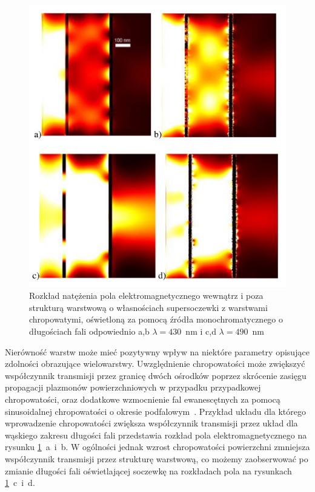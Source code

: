 \begin{figure}[!hbt]
	\begin{center}
	\includegraphics[width=.9\textwidth]{images/multilayer/plp-chropo.png}
	\end{center}
	\caption{Rozkład natężenia pola elektromagnetycznego wewnątrz i poza strukturą warstwową o własnościach supersoczewki z warstwami chropowatymi, oświetloną za pomocą źródła monochromatycznego o długościach fali odpowiednio a,b $\lambda=430$~nm  i  c,d $\lambda=490$~nm~\cite{Stolarek_2013}}
	\label{fig:plp-chropo-fdtd}
\end{figure}


Nierówność warstw może mieć pozytywny wpływ na niektóre parametry opisujące zdolności obrazujące wielowarstwy. Uwzględnienie chropowatości może zwiększyć współczynnik transmisji przez granicę dwóch ośrodków poprzez skrócenie zasięgu propagacji plazmonów powierzchniowych w przypadku przypadkowej chropowatości, oraz dodatkowe wzmocnienie fal ewanescętnych za pomocą sinusoidalnej chropowatości o okresie podfalowym~\cite{huang2012subwavelength}. Przykład układu dla którego wprowadzenie chropowatości zwiększa współczynnik transmisji przez układ dla wąskiego zakresu długości fali przedstawia rozkład pola elektromagnetycznego na rysunku \ref{fig:plp-chropo-fdtd}~a~i~b. W ogólności jednak wzrost chropowatości powierzchni zmniejsza współczynnik transmisji przez strukturę warstwową, co możemy zaobserwować po zmianie długości fali oświetlającej soczewkę na rozkładach pola na rysunkach \ref{fig:plp-chropo-fdtd}~c~i~d. 

